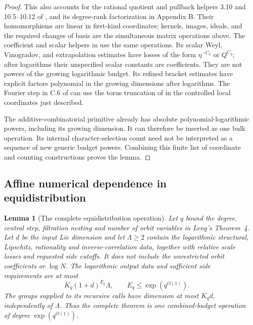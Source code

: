 \documentclass[11pt,a4paper]{article}
\newtheorem{lemma}[theorem]{Lemma}
\theoremstyle{definition}
\begin{document}
\begin{proof}
This also accounts for the rational quotient and pullback helpers
3.10 and 10.5--10.12 of \cite{lss}, and its degree-rank
factorization in Appendix B. Their homomorphisms are linear in
first-kind coordinates; kernels, images, ideals, and the required
changes of basis are the simultaneous matrix operations above.
The coefficient and scalar helpers in \cite[Appendix A]{leng}
use the same operations. Its scalar Weyl, Vinogradov, and
extrapolation estimates have losses of the form
\(\eta^{-C_q}\) or \(Q^{C_q}\); after logarithms their unspecified
scalar constants are coefficients. They are not powers of the
growing logarithmic budget. Its refined bracket estimates have
explicit factors polynomial in the growing dimensions after
logarithms. The Fourier step in C.6 of \cite{lss} can use the
torus truncation of \cite[Lemma A.5]{leng} in the controlled
local coordinates just described.

The additive-combinatorial primitive \cite[Lemma A.1]{lss} already
has absolute polynomial-logarithmic powers, including its growing
dimension. It can therefore be inserted as one bulk operation. Its
internal character-selection count need not be interpreted as a
sequence of new generic budget powers. Combining this finite list
of coordinate and counting constructions proves the lemma.
\end{proof}

\subsection{Affine numerical dependence in equidistribution}

\begin{lemma}[The complete equidistribution operation]\label{single:equid}
Let \(q\) bound the degree, central step, filtration nesting and
number of orbit variables in Leng's Theorem~4. Let \(d\) be the
input Lie dimension and let \(\Lambda\ge2\) contain the logarithmic
structural, Lipschitz, rationality and inverse-correlation data, together
with relative scale losses and requested side cutoffs. It does not
include the unrestricted orbit coefficients or \(\log N\).
The logarithmic output data and sufficient side requirements are at most
\[
 K_q(1+d)^{E_q}\Lambda,\qquad E_q\le\exp(q^{O(1)}).
\]
The groups supplied to its recursive calls have dimension at most
\(K_qd\), independently of \(\Lambda\). Thus the complete theorem
is one combined-budget operation of degree \(\exp(q^{O(1)})\).
\end{lemma}
\end{document}
